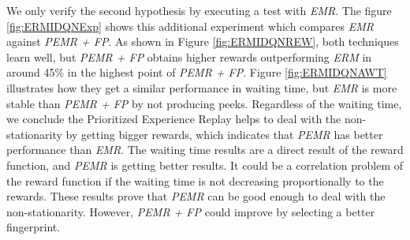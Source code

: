 \documentclass{llncs}
\begin{document}
We only verify the second hypothesis by executing a test with \textit{EMR}. The figure \ref{fig:ERMIDQNExp} shows this additional experiment which compares \textit{EMR} against \textit{PEMR + FP}. As shown in Figure \ref{fig:ERMIDQNREW}, both techniques learn well, but \textit{PEMR + FP} obtains higher rewards outperforming \textit{ERM} in around 45$\%$ in the highest point of \textit{PEMR + FP}. Figure \ref{fig:ERMIDQNAWT} illustrates how they get a similar performance in waiting time, but \textit{EMR} is  more stable than \textit{PEMR + FP} by not producing peeks. Regardless of the waiting time, we conclude the Prioritized Experience Replay helps to deal with the non-stationarity by getting bigger rewards, which indicates that \textit{PEMR} has better performance than \textit{EMR}. The waiting time results are a direct result of the reward function, and \textit{PEMR} is getting better results. It could be a correlation problem of the reward function if the waiting time is not decreasing proportionally to the rewards. These results prove that \textit{PEMR} can be good enough to deal with the non-stationarity. However, \textit{PEMR + FP} could improve by selecting a better fingerprint.
\end{document}

